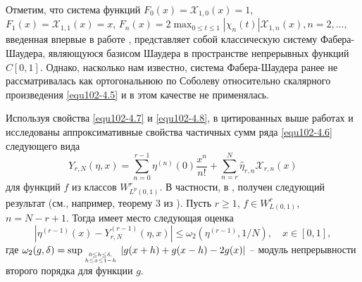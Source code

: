 Отметим, что система функций $F_0(x)=\mathcal{ X}_{1,0}(x)=1$, $F_1(x)=\mathcal{ X}_{1,1}(x)=x$,
$F_n(x)=2\max_{0\le t\le1}|\chi_{n}(t)|\mathcal{ X}_{1,n}(x), n=2,\ldots,$
введенная впервые  в работе \cite{Faber}, представляет собой классическую систему Фабера-Шаудера, являющуюся базисом Шаудера в пространстве непрерывных функций $C[0,1]$.  Однако, насколько нам известно,  система Фабера-Шаудера ранее не рассматривалась как ортогональнюю по Соболеву относительно скалярного произведения \eqref{equ102-4.5} и в этом качестве не применялась.

Используя свойства \eqref{equ102-4.7} и \eqref{equ102-4.8}, в цитированных выше работах  \cite{Shar19} и \cite{Shar20} исследованы аппроксимативные свойства частичных сумм  ряда \eqref{equ102-4.6} следующего вида
\begin{equation}\label{equ102-4.11}
 Y_{r,N}(\eta,x)=\sum_{n=0}^{r-1} \eta^{(n)}(0)\frac{x^n}{n!}+ \sum_{n=r}^{N}\hat \eta_{r,n}\mathcal{ X}_{r,n}(x)
 \end{equation}
 для функций $f$ из  классов  $W^r_{L^p(0,1)}$. В частности, в \cite{Shar19}, \cite{Shar20} получен следующий результат (см., например, теорему 3 из \cite{Shar20}). Пусть $r\ge1$, $f\in W^r_{L(0,1)}$, $n=N-r+1$.  Тогда имеет место следующая оценка
\begin{equation}\label{equ102-4.12}
|\eta^{(r-1)}(x)-Y_{r,N}^{(r-1)}(\eta,x)| \le \omega_2(\eta^{(r-1)},1/N), \quad x\in[0,1],
\end{equation}
где $\omega_2(g,\delta)=\sup_{\atop{ 0\le h\le\delta,\atop h\le x\le 1-h}}|g(x+h)+g(x-h)-2g(x)|$ -- модуль непрерывности второго порядка для функции $g$.

